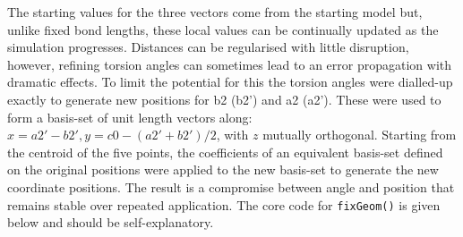 The starting values for the three vectors come from the starting model but, unlike
fixed bond lengths, these local values can be continually updated as the simulation
progresses.  Distances can be regularised with little disruption,
however, refining torsion angles can sometimes lead to an error propagation
with dramatic effects.  To limit the potential for this the torsion angles were
dialled-up exactly to generate new positions for b2 (b2') and a2 (a2').   These were
used to form a basis-set of unit length vectors along: $x = a2'-b2', y = c0-(a2'+b2')/2$,
with $z$ mutually orthogonal.   Starting from the centroid of the five points, the
coefficients of an equivalent basis-set defined on the original positions were applied
to the new basis-set to generate the new coordinate positions.  The result is a
compromise between angle and position that remains stable over repeated application.
The core code for {\tt fixGeom()} is given below and should be self-explanatory.

